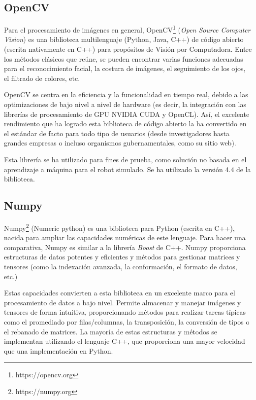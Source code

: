 \subsection{OpenCV}

Para el procesamiento de imágenes en general, OpenCV\footnote{https://opencv.org} (\textit{Open Source Computer Vision}) es una biblioteca multilenguaje (Python, Java, C++) de código abierto (escrita nativamente en C++) para propósitos de Visión por Computadora. Entre los métodos clásicos que reúne, se pueden encontrar varias funciones adecuadas para el reconocimiento facial, la costura de imágenes, el seguimiento de los ojos, el filtrado de colores, etc.

OpenCV se centra en la eficiencia y la funcionalidad en tiempo real, debido a las optimizaciones de bajo nivel a nivel de hardware (es decir, la integración con las librerías de procesamiento de GPU NVIDIA CUDA y OpenCL). Así, el excelente rendimiento que ha logrado esta biblioteca de código abierto la ha convertido en el estándar de facto para todo tipo de usuarios (desde investigadores hasta grandes empresas o incluso organismos gubernamentales, como su sitio web).

Esta librería se ha utilizado para fines de prueba, como solución no basada en el aprendizaje a máquina para el robot simulado. Se ha utilizado la versión 4.4 de la biblioteca.

\subsection{Numpy}

Numpy\footnote{https://numpy.org} (Numeric python) es una biblioteca para Python (escrita en C++), nacida para ampliar las capacidades numéricas de este lenguaje. Para hacer una comparativa, Numpy es similar a la librería \textit{Boost} de C++. Numpy proporciona estructuras de datos potentes y eficientes y métodos para gestionar matrices y tensores (como la indexación avanzada, la conformación, el formato de datos, etc.)

Estas capacidades convierten a esta biblioteca en un excelente marco para el procesamiento de datos a bajo nivel. Permite almacenar y manejar imágenes y tensores de forma intuitiva, proporcionando métodos para realizar tareas típicas como el promediado por filas/columnas, la transposición, la conversión de tipos o el rebanado de matrices. La mayoría de estas estructuras y métodos se implementan utilizando el lenguaje C++, que proporciona una mayor velocidad que una implementación en Python.

